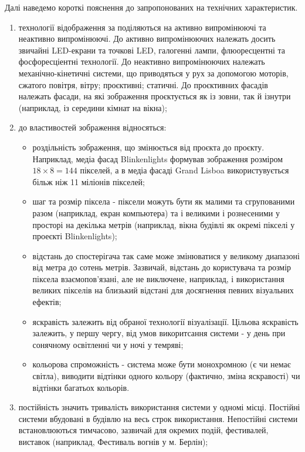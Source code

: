 \documentclass[a4paper,ukrainian,utf8,nocolumnsxix,floatsection,equationsection]{eskdtext}
\newcommand{\todoi}[1]{\todo[inline]{#1}}
\begin{document}
\todoi{схема}

Далі наведемо короткі пояснення до запропонованих на  технічних характеристик.

\begin{enumerate}
	\item технології відображення за  поділяються на активно випромінюючі та неактивно випромінюючі. До активно випромінюючих належать досить звичайні LED-екрани та точкові LED, галогенні лампи, флюоресцентні та фосфоресціентні технології. До неактивно випромінюючих належать механічно-кінетичні системи, що приводяться у рух за допомогою моторів, сжатого повітря, вітру; проєктивні; статичні. До проєктивних фасадів належать фасади, на які зображення проєктується як із зовни, так й ізнутри (наприклад, із середини кімнат на вікна);
	\item до властивостей зображення відносяться:
		\begin{itemize}
			\item роздільність зображення, що змінюється від проєкта до проєкту. Наприклад, медіа фасад Blinkenlights формував зображення розміром $18\times8=144$ пікселей, а в медіа фасаді Grand Lisboa використувується більж ніж 11 міліонів пікселей;
			\item шаг та розмір піксела - піксели можуть бути як малими та сгрупованими разом (наприклад, екран компьютера) та і великими і рознесеними у просторі на декілька метрів (наприклад, вікна будівлі як окремі пікселі у проеєкті Blinkenlights);
			\item відстань до спостерігача так саме може змінюватися у великому диапазоні від метра до сотень метрів. Зазвичай, відстань до користувача та розмір піксела взаємопов’язані, але не виключене, наприклад, і використання великих пікселів на близький відстані для досягнення певних візуальних ефектів;
			\item яскравість залежить від обраної технології візуалізації. Цільова яскравість залежить, у першу чергу, від умов викоритсання системи - у день при сонячному освітленні чи у ночі у темряві;
			\item кольорова спроможність - система може бути монохромною (є чи немає світла), виводити відтінки одного кольору (фактично, зміна яскравості) чи відтінки багатьох кольорів.
		\end{itemize}
	\item постійність значить тривалість використання системи у одномі місці. Постійні системи вбудовані в будівлю на весь строк використання. Непостійні системи встановлюються тимчасово, зазвичай для окремих подій, фестивалей, виставок (наприклад, Фестиваль вогнів у м. Берлін);

\end{enumerate}
\end{document}
